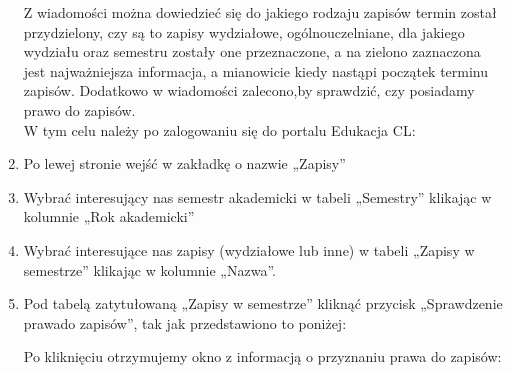 \documentclass[11pt]{article}
\begin{document}
\begin{enumerate}
\vspace{0.1cm}

\indent \hspace{0.5cm} Z wiadomości można dowiedzieć się do jakiego rodzaju zapisów termin został przydzielony, czy są to zapisy wydziałowe, ogólnouczelniane, dla jakiego wydziału oraz semestru zostały one przeznaczone, a na zielono zaznaczona jest najważniejsza informacja, a mianowicie kiedy nastąpi początek terminu zapisów. Dodatkowo w wiadomości zalecono,\linebreak by sprawdzić, czy posiadamy prawo do zapisów.\\
\indent \hspace{0.5cm} W tym celu należy po zalogowaniu się do portalu Edukacja CL:
\item Po lewej stronie wejść w zakładkę o nazwie „Zapisy”
\item Wybrać interesujący nas semestr akademicki w tabeli „Semestry” klikając w kolumnie „Rok akademicki”
\item Wybrać interesujące nas zapisy (wydziałowe lub inne) w tabeli „Zapisy w semestrze” klikając w kolumnie „Nazwa”.
\item Pod tabelą zatytułowaną „Zapisy w semestrze” kliknąć przycisk „Sprawdzenie prawa\linebreak do zapisów”, tak jak przedstawiono to poniżej:\\


\vspace{0.1cm}

Po kliknięciu otrzymujemy okno z informacją o przyznaniu prawa do zapisów:\\


\end{enumerate}
\end{document}
